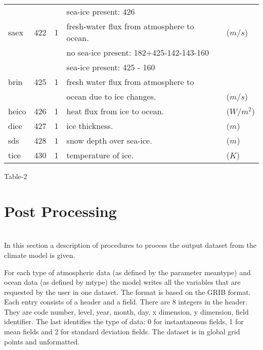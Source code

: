\begin{tabular}{lllll}
        &         &     &sea-ice present: 426                    &              \\
 saex  &    422   &  1  &fresh-water flux from atmosphere to ocean.   &($m/s$)  \\
       &        &       &no sea-ice present: 182+425-142-143-160 &              \\
       &        &       &sea-ice present: 425 - 160              &              \\
 brin  &  425  &   1    &fresh water flux from atmosphere to     &              \\
       &       &        &ocean due to ice changes.               &    ($m/s$)   \\       
 heico &  426  &    1   &heat flux from ice to ocean.            &    ($W/m^2$) \\
 dice  &  427  &    1   &ice thickness.                          &    ($m$)     \\
 sds   &  428  &    1   &snow depth over sea-ice.                &    ($m$)     \\ 
 tice  &  430  &    1   &temperature of ice.                     &    ($K$)     \\  \hline
\hline
\end{tabular}
Table-2


\newpage
\baselineskip=20pt
\section{Post Processing}

\\

In this section a description of procedures to process the output
dataset from the climate model is given.  

For each type of atmospheric data (as defined by the parameter meantype) and ocean data 
(as defined by mtype) the model writes all the variables that are requested by the user in one dataset.
The format is based on the GRIB format. Each entry consists of
a header and a field. 
There are 8 integers in the header. They are code number, level,
year, month, day, x dimension, y dimension, field identifier. The
last identifies the type of data: 0 for instantaneous fields, 1 for mean fields and 2 for
standard deviation fields. The dataset is in global grid points and unformatted.
 
